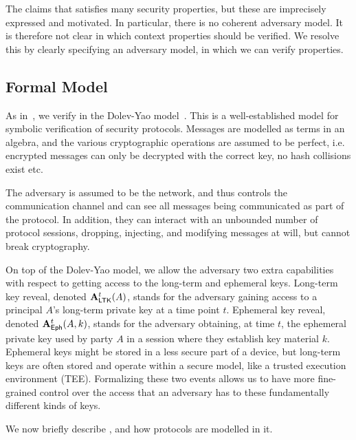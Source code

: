 The \mEdhoc{} \mSpec{} \cite{our-analysis-selander-lake-edhoc-00} claims
that \mEdhoc{} satisfies many security properties, but these are imprecisely
expressed and motivated.
%
In particular, there is no coherent adversary model.
%
It is therefore not clear in which context properties should be verified.
%
We resolve this by clearly specifying an adversary model, in which we can verify
properties.
%

\subsection{Formal Model}\label{sec:threat-model}
 As in~\cite{Norr21}, we verify \mEdhoc{} in the Dolev-Yao model~\cite{DY83}.
%
This is a well-established model for symbolic verification of security protocols.
%
Messages are modelled as terms in an algebra, and the various cryptographic operations are assumed to be perfect, i.e. encrypted messages can only be decrypted with the correct key, no hash collisions exist etc.
%

The adversary is assumed to be the network, and thus controls the communication channel and can see all messages being communicated as part of the protocol.
%
In addition, they can interact with an unbounded number of protocol sessions, dropping, injecting, and modifying messages at will, but cannot break cryptography.

On top of the Dolev-Yao model, we allow the adversary two extra capabilities with respect to getting access to the long-term and ephemeral keys. 
%
Long-term key reveal, denoted $\mathbf{A}_{\textsf{LTK}}^{t}(A)$, stands for the adversary gaining access to a principal $A$'s long-term private key  at a time point $t$.
%
Ephemeral key reveal, denoted $\mathbf{A}_{\textsf{Eph}}^{t}(A, k)$, stands for the adversary obtaining, at time $t$, the ephemeral private key  used by party $A$  in a session where they establish key material $k$.
%
Ephemeral keys might be stored in a less secure part of a device, but long-term keys are often stored and operate within a secure model, like a trusted execution environment (TEE). 
%
Formalizing these two events allows us to have more fine-grained control over the access that an adversary has to these fundamentally different kinds of keys.
%

We now briefly describe \mTamarin{}, and how protocols are modelled in it.


